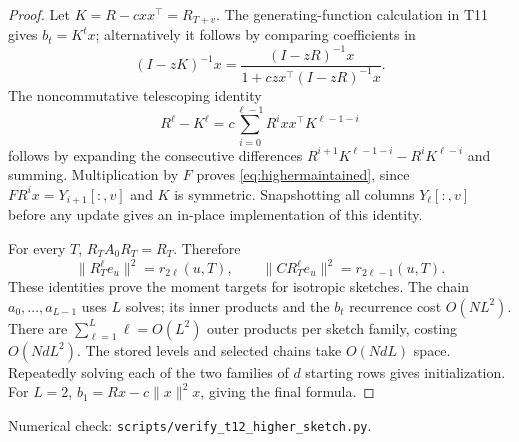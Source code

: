 \documentclass[11pt]{article}
\begin{document}
\begin{proof}
Let $K=R-cxx^\top=R_{T+v}$. The generating-function calculation
in T11 gives $b_t=K^tx$; alternatively it follows by comparing
coefficients in
\[
 (I-zK)^{-1}x=
 \frac{(I-zR)^{-1}x}{1+czx^\top(I-zR)^{-1}x}.
\]
The noncommutative telescoping identity
\[
 R^\ell-K^\ell=c\sum_{i=0}^{\ell-1}R^ixx^\top K^{\ell-1-i}
\]
follows by expanding the consecutive differences
$R^{i+1}K^{\ell-1-i}-R^iK^{\ell-i}$ and summing.
Multiplication by $F$ proves \eqref{eq:highermaintained}, since
$FR^ix=Y_{i+1}[:,v]$ and $K$ is symmetric.
Snapshotting all columns $Y_\ell[:,v]$ before any update gives
an in-place implementation of this identity.

For every $T$, $R_TA_0R_T=R_T$. Therefore
\[
 \|R_T^\ell e_u\|^2=r_{2\ell}(u,T),\qquad
 \|CR_T^\ell e_u\|^2=r_{2\ell-1}(u,T).
\]
These identities prove the moment targets for isotropic sketches.
The chain $a_0,\ldots,a_{L-1}$ uses $L$ solves; its inner
products and the $b_t$ recurrence cost $O(NL^2)$.
There are $\sum_{\ell=1}^L\ell=O(L^2)$ outer products per
sketch family, costing $O(NdL^2)$. The stored levels and
selected chains take $O(NdL)$ space. Repeatedly solving each
of the two families of $d$ starting rows gives initialization.
For $L=2$, $b_1=Rx-c\|x\|^2x$, giving the final formula.
\end{proof}
\noindent Numerical check:
\texttt{scripts/verify\_t12\_higher\_sketch.py}.
\end{document}
